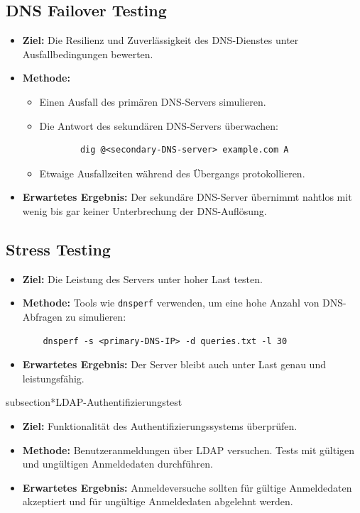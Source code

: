 \documentclass[a4paper,12pt]{article}
\begin{document}
\subsection*{DNS Failover Testing}
\begin{itemize}[leftmargin=1.5cm]
	\item \textbf{Ziel:} Die Resilienz und Zuverlässigkeit des DNS-Dienstes unter Ausfallbedingungen bewerten.
	\item \textbf{Methode:}
	      \begin{itemize}
		      \item Einen Ausfall des primären DNS-Servers simulieren.
		      \item Die Antwort des sekundären DNS-Servers überwachen:
		            \begin{verbatim}
        dig @<secondary-DNS-server> example.com A
        \end{verbatim}
		      \item Etwaige Ausfallzeiten während des Übergangs protokollieren.
	      \end{itemize}
	\item \textbf{Erwartetes Ergebnis:} Der sekundäre DNS-Server übernimmt nahtlos mit wenig bis gar keiner Unterbrechung der DNS-Auflösung.
\end{itemize}

\subsection*{Stress Testing}
\begin{itemize}[leftmargin=1.5cm]
	\item \textbf{Ziel:} Die Leistung des Servers unter hoher Last testen.
	\item \textbf{Methode:} Tools wie \texttt{dnsperf} verwenden, um eine hohe Anzahl von DNS-Abfragen zu simulieren:
	      \begin{verbatim}
    dnsperf -s <primary-DNS-IP> -d queries.txt -l 30
    \end{verbatim}
	\item \textbf{Erwartetes Ergebnis:} Der Server bleibt auch unter Last genau und leistungsfähig.
\end{itemize}

subsection*{LDAP-Authentifizierungstest}
\begin{itemize}[label=--]
	\item \textbf{Ziel:} Funktionalität des Authentifizierungssystems überprüfen.
	\item \textbf{Methode:} Benutzeranmeldungen über LDAP versuchen. Tests mit gültigen und ungültigen Anmeldedaten durchführen.
	\item \textbf{Erwartetes Ergebnis:} Anmeldeversuche sollten für gültige Anmeldedaten akzeptiert und für ungültige Anmeldedaten abgelehnt werden.
\end{itemize}
\end{document}
